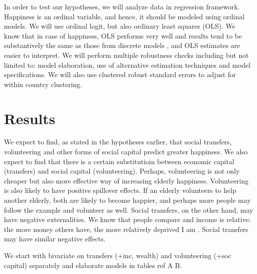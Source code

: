 \documentclass[10pt, letterpaper]{article}
\begin{document}
\begin{spacing}{1.4}
In order to test our hypotheses, we will analyze data in regression framework. 
Happiness is an ordinal variable, and hence, it should be modeled using ordinal
models. We will use ordinal logit, but also ordinary least squares (OLS). We know that
in case of happiness, OLS performs very well and results tend to be substantively
the same as those from discrete models \citep{carbonell04,blanchflower11}, and
OLS estimates are easier to interpret.
We will perform multiple robustness checks including but not limited to: model
elaboration, use of alternative estimation techniques and model specifications.
We will also use clustered robust standard errors to adjust for within country clustering.



\section{Results}


 We expect to
find, as stated in the hypotheses earlier, that social transfers, volunteering
and other forms of social capital predict greater happiness. We also expect to
find that there is a  certain substitutioin  between economic capital (transfers) and social
capital (volunteering). Perhaps, volunteering is not only cheaper but also more
effective way of increasing elderly happiness. Volunteering is also likely to have
positive spillover effects. If an elderly volunteers to help another elderly,
both are  likely to become happier, and perhaps more people may follow the
example and volunteer as well. Social transfers, on the other hand, may have
negative externalities. We know that people compare and income is relative: the
more money others have, the more relatively deprived I am
\citep{michalos85,luttmer05,bender12}. Social transfers may have similar negative
effects. 


We start with bivariate on transfers (+inc, wealth) and volunteering (+soc
capital) separately and elaborate models in tables ref A B. 


\end{spacing}
\end{document}
